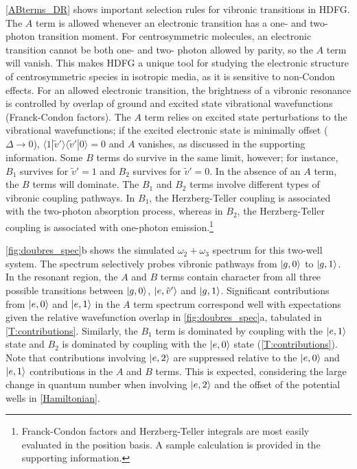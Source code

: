 \documentclass[aip, jcp, reprint, onecolumn, nofootinbib]{revtex4-2}
\begin{document}
\autoref{ABterms_DR} shows important selection rules for vibronic transitions in HDFG.
The $A$ term is allowed whenever an electronic transition has a one- and two- photon transition moment.
For centrosymmetric molecules, an electronic transition cannot be both one- and two- photon allowed by parity, so the $A$ term will vanish.
This makes HDFG a unique tool for studying the electronic structure of centrosymmetric species in isotropic media, as it is sensitive to non-Condon effects.\cite{Milojevich2011, Olson2018}
For an allowed electronic transition, the brightness of a vibronic resonance is controlled by overlap of ground and excited state vibrational wavefunctions (Franck-Condon factors).
The $A$ term relies on excited state perturbations to the vibrational wavefunctions; if the excited electronic state is minimally offset ($\Delta \rightarrow 0$), $\langle 1 | \tilde{v}' \rangle \langle \tilde{v}' | 0 \rangle = 0$ and $A$ vanishes, as discussed in the supporting information.
Some $B$ terms do survive in the same limit, however; for instance, $B_1$ survives for $\tilde{v}'=1$ and $B_2$ survives for $\tilde{v}'=0$.
In the absence of an $A$ term, the $B$ terms will dominate.
The $B_1$ and $B_2$ terms involve different types of vibronic coupling pathways.
In $B_1$, the Herzberg-Teller coupling is associated with the two-photon absorption process, whereas in $B_2$, the Herzberg-Teller coupling is associated with one-photon emission.\footnote{Franck-Condon factors and Herzberg-Teller integrals are most easily evaluated in the position basis. A sample calculation is provided in the supporting information.}

\autoref{fig:doubres_spec}b shows the simulated $\omega_2+\omega_3$ spectrum for this two-well system.  The spectrum selectively probes vibronic pathways from $\ket{g,0}$ to $\ket{g,1}$.
In the resonant region, the $A$ and $B$ terms contain character from all three possible transitions between $\ket{g,0}$, $\ket{e,\tilde{v}'}$ and $\ket{g,1}$. 
Significant contributions from $\ket{e,0}$ and $\ket{e,1}$ in the $A$ term spectrum correspond well with expectations given the relative wavefunction overlap in \autoref{fig:doubres_spec}a, tabulated in \autoref{T:contributions}. 
Similarly, the $B_1$ term is dominated by coupling with the $\ket{e,1}$ state and $B_2$ is dominated by coupling with the $\ket{e,0}$ state (\autoref{T:contributions}). 
Note that contributions involving $\ket{e,2}$ are suppressed relative to the $\ket{e,0}$ and $\ket{e,1}$ contributions in the $A$ and $B$ terms.
This is expected, considering the large change in quantum number when involving $\ket{e,2}$ and the offset of the potential wells in \autoref{Hamiltonian}.
\end{document}
